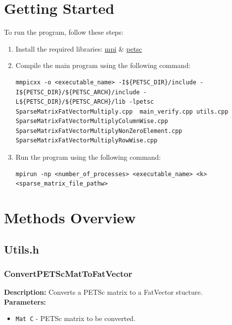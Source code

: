 \documentclass[12pt,oneside]{book} %
\begin{document}
\begin{subappendices}
    \section{Getting Started}
    To run the program, follow these steps:
    \begin{enumerate}
        \itemindent=17.87pt
        \item Install the required libraries:
              \href{https://docs.open-mpi.org/en/main/installing-open-mpi/quickstart.html}{mpi}
              \& \href{https://petsc.org/release/install/}{petsc}
        \item Compile the main program using the following command:
              \begin{lstlisting}[style=bashstyle]
                mmpicxx -o <executable_name> -I${PETSC_DIR}/include -I${PETSC_DIR}/${PETSC_ARCH}/include -L${PETSC_DIR}/${PETSC_ARCH}/lib -lpetsc SparseMatrixFatVectorMultiply.cpp  main_verify.cpp utils.cpp SparseMatrixFatVectorMultiplyColumnWise.cpp SparseMatrixFatVectorMultiplyNonZeroElement.cpp SparseMatrixFatVectorMultiplyRowWise.cpp
            \end{lstlisting}
        \item Run the program using the following command:
              \begin{lstlisting}[style=bashstyle]
                mpirun -np <number_of_processes> <executable_name> <k> <sparse_matrix_file_pathw>
            \end{lstlisting}
    \end{enumerate}

    \section{Methods Overview}
    \subsection{Utils.h}
    \subsubsection{ConvertPETScMatToFatVector}

    \textbf{Description:} Converts a PETSc matrix to a FatVector stucture.\\

    \textbf{Parameters:}
    \begin{itemize}
        \item \texttt{Mat C} - PETSc matrix to be converted.
    \end{itemize}


\end{subappendices}
\end{document}
